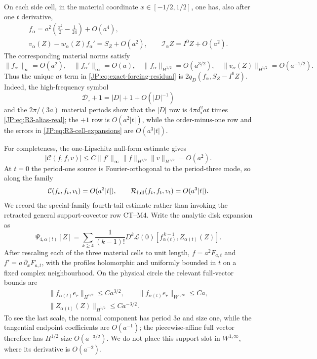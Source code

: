 On each side cell, in the material coordinate
$x\in[-1/2,1/2]$, one has, also after one $t$ derivative,
\begin{equation}\label{JP:eq:R3-cell-expansions}
\begin{gathered}
 f_\alpha=a^2\left(\frac{x^2}{2}-\frac1{24}\right)+O(a^4),\\
 v_\alpha(Z)-w_\alpha(Z)f_\alpha'=S_Z+O(a^2),
 \qquad \mathcal I_\alpha Z=I^0Z+O(a^2).
\end{gathered}
\end{equation}
The corresponding material norms satisfy
\begin{equation}\label{JP:eq:R3-material-scales}
 \|f_\alpha\|_\infty=O(a^2),\quad
 \|f_\alpha'\|_\infty=O(a),\quad
 \|f_\alpha\|_{H^{1/2}}=O(a^{3/2}),\quad
 \|v_\alpha(Z)\|_{H^{1/2}}=O(a^{-1/2}).
\end{equation}
Thus the unique $at$ term in
\eqref{JP:eq:exact-forcing-residual} is
$2q_D(f_\alpha,S_Z-I^0Z)$.  Indeed, the high-frequency symbol
\[
 \mathcal D_\circ+1=|D|+1+O(|D|^{-1})
\]
and the $2\pi/(3a)$ material periods show that the $|D|$ row is
$4\pi d_\circ^2at$ times \eqref{JP:eq:R3-alias-real}; the $+1$ row is
$O(a^2|t|)$, while the order-minus-one row and the errors in
\eqref{JP:eq:R3-cell-expansions} are $O(a^3|t|)$.

For completeness, the one-Lipschitz null-form estimate gives
\[
 |\mathcal C(f,f,v)|
 \le C\|f'\|_\infty
       \|f\|_{H^{1/2}}\|v\|_{H^{1/2}}=O(a^2).
\]
At $t=0$ the period-one source is Fourier-orthogonal to the period-three
mode, so along the family
\begin{equation}\label{JP:eq:R3-lower-orders}
 \mathcal C(f_t,f_t,v_t)=O(a^2|t|),\qquad
 \mathcal R_{\rm full}(f_t,f_t,v_t)=O(a^3|t|).
\end{equation}
We record the special-family fourth-tail estimate rather than invoking
the retracted general support-covector row CT--M4.  Write the analytic
disk expansion as
\[
 \Psi_{4,\alpha(t)}[Z]
 =\sum_{k\ge4}\frac1{(k-1)!}
 D^k\mathcal L(0)
 [f_{\alpha(t)}^{\,k-1},Z_{\alpha(t)}(Z)].
\]
After rescaling each of the three material cells to unit length,
$f=a^2F_{a,t}$ and $f'=a\,\partial_xF_{a,t}$, with the profiles
holomorphic and uniformly bounded in $t$ on a fixed complex
neighbourhood.  On the
physical circle the relevant full-vector bounds are
\begin{equation}\label{JP:eq:R3-full-vector-scales}
\begin{gathered}
 \|f_{\alpha(t)}e_r\|_{H^{1/2}}\le Ca^{3/2},\qquad
 \|f_{\alpha(t)}e_r\|_{W^{1,\infty}}\le Ca,\\
 \|Z_{\alpha(t)}(Z)\|_{H^{1/2}}\le Ca^{-3/2}.
\end{gathered}
\end{equation}
To see the last scale, the normal component has period $3a$ and size one,
while the
tangential endpoint coefficients are $O(a^{-1})$; the piecewise-affine
full vector therefore has $H^{1/2}$ size $O(a^{-3/2})$.  We do not place
this support slot in $W^{1,\infty}$, where its derivative is
$O(a^{-2})$.

